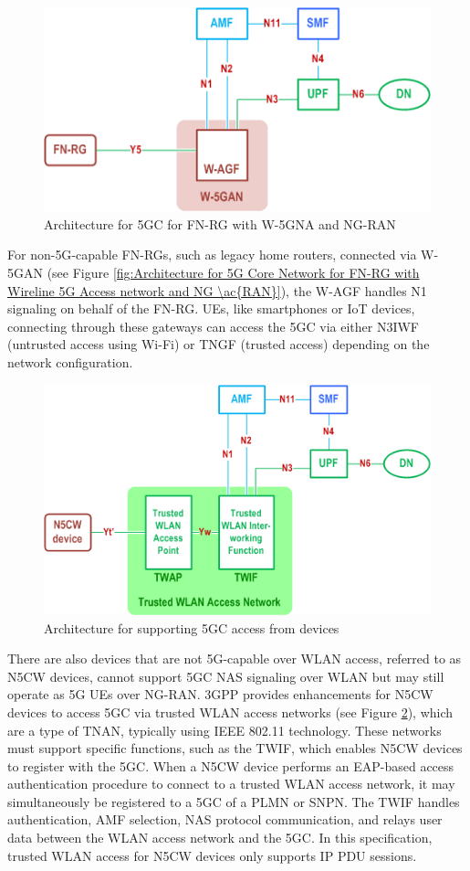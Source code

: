 \begin{figure}
    \centering
    \includegraphics[width=0.5\linewidth]{figs/Architecture for 5G Core Network for FN-RG with Wireline 5G Access network and NG RAN.png}
    \caption{Architecture for \acl{5GC} for \ac{FN-RG} with \ac{W-5GNA} and \ac{NG-RAN}}
    \label{fig:Architecture for 5G Core Network for FN-RG with Wireline 5G Access network and NG RAN}
\end{figure}

For non-\ac{5G}-capable \acp{FN-RG}, such as legacy home routers, connected via \ac{W-5GAN} (see Figure \ref{fig:Architecture for 5G Core Network for FN-RG with Wireline 5G Access network and NG \ac{RAN}}), the \ac{W-AGF} handles N1 signaling on behalf of the \ac{FN-RG}. \acp{UE}, like smartphones or \ac{IoT} devices, connecting through these gateways can access the \ac{5GC} via either \ac{N3IWF} (untrusted access using Wi-Fi) or \ac{TNGF} (trusted access) depending on the network configuration.

\begin{figure}
    \centering
    \includegraphics[width=0.5\linewidth]{figs/Architecture for supporting 5GC access from N5CW devices.png}
    \caption{Architecture for supporting \ac{5GC} access from \ac{} devices}
    \label{fig:Architecture for supporting 5GC access from N5CW devices}
\end{figure}

There are also devices that are not \ac{5G}-capable over \ac{WLAN} access, referred to as \ac{N5CW} devices, cannot support \ac{5GC} \ac{NAS} signaling over \ac{WLAN} but may still operate as \ac{5G} \acp{UE} over \ac{NG-RAN}. \ac{3GPP} provides enhancements for N5CW devices to access \ac{5GC} via trusted \ac{WLAN} access networks (see Figure \ref{fig:Architecture for supporting 5GC access from N5CW devices}), which are a type of \ac{TNAN}, typically using IEEE 802.11 technology. These networks must support specific functions, such as the \ac{TWIF}, which enables \ac{N5CW} devices to register with the \ac{5GC}. When a \ac{N5CW} device performs an \ac{EAP}-based access authentication procedure to connect to a trusted \ac{WLAN} access network, it may simultaneously be registered to a \ac{5GC} of a \ac{PLMN} or \ac{SNPN}. The \ac{TWIF} handles authentication, \ac{AMF} selection, \ac{NAS} protocol communication, and relays user data between the \ac{WLAN} access network and the \ac{5GC}. In this specification, trusted \ac{WLAN} access for \ac{N5CW} devices only supports IP \ac{PDU} sessions.

